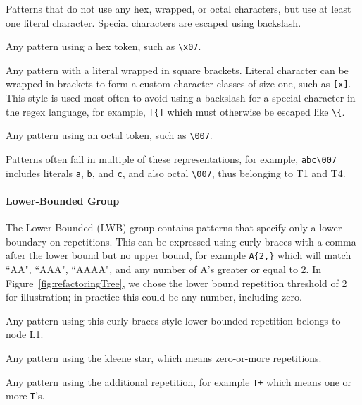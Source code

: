 \begin{description}  \itemsep -1pt
\item[T1:] Patterns that do not use any hex, wrapped, or octal characters, but use at least one literal character. Special characters are escaped using backslash. 
\item[T2:] Any pattern using a hex token, such as \verb!\x07!.
\item[T3:]  Any pattern with a literal wrapped in square brackets. 
Literal character can be wrapped in brackets to form a custom character classes of size one, such as \verb![x]!. This style is used most often to avoid using a backslash for a special character in the regex language, for example, \verb![{]! which must otherwise be escaped like \verb!\{!.

\item[T4:] Any pattern using an octal token, such as \verb!\007!.
\end{description}

Patterns often fall in multiple of these representations, for example, \verb!abc\007! includes literals \verb!a!, \verb!b!, and \verb!c!, and also octal \verb!\007!, thus belonging to T1 and T4.

\paragraph{Lower-Bounded Group}
The Lower-Bounded (LWB) group contains patterns that specify only a lower boundary on  repetitions. This can be expressed using curly braces with a comma after the lower bound but no upper bound, for example \verb!A{2,}! which will match ``AA", ``AAA", ``AAAA", and any number of A's greater or equal to 2.  In Figure~\ref{fig:refactoringTree}, we chose the lower bound repetition threshold of  2 for illustration; in practice this could be any number, including zero.


\begin{description}  \itemsep -1pt
\item[L1:] Any pattern using this curly braces-style lower-bounded repetition belongs to node L1.
\item[L2:] Any pattern using the kleene star, which  means zero-or-more repetitions. %
\item[L3:] Any pattern using the additional repetition, for example \verb!T+! which means one or more \verb!T!'s.  
\end{description}

